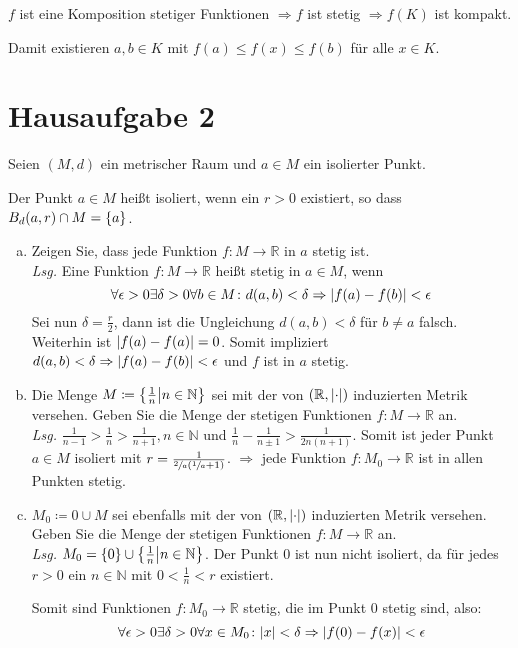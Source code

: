 \documentclass{scrreprt}
\begin{document}
$f$ ist eine Komposition stetiger Funktionen
$\Rightarrow f$ ist stetig
$\Rightarrow f(K)$ ist kompakt.

Damit existieren $a, b \in K$ mit $f(a) \leq f(x) \leq f(b)$ für alle
$x \in K$.

\newpage
\section*{Hausaufgabe 2}

Seien $(M, d)$ ein metrischer Raum und $a \in M$ ein isolierter Punkt.

\noindent
Der Punkt $a \in M$ heißt isoliert, wenn ein $r > 0$ existiert, so dass
$B_d(a, r) \cap M = \qty{a}$.

\begin{enumerate}[a)]
\item Zeigen Sie, dass jede Funktion $f \colon M \to \mathbb{R}$ in $a$
  stetig ist. \\

  \textit{Lsg.} Eine Funktion $f \colon M \to \mathbb{R}$ heißt stetig in
  $a \in M$, wenn
  \[
    \forall \epsilon > 0 \exists \delta > 0 \forall b \in M
    \colon d(a, b) < \delta \Rightarrow \abs{f(a) - f(b)} < \epsilon
  \]
  Sei nun $\delta = \frac{r}{2}$, dann ist die Ungleichung
  $d(a, b) < \delta$ für $b \ne a$ falsch.
  Weiterhin ist $\abs{f(a) - f(a)} = 0$.
  Somit impliziert $d(a, b) < \delta \Rightarrow \abs{f(a) - f(b)} < \epsilon$
  und $f$ ist in $a$ stetig.

\item Die Menge $M \coloneqq \qty{\frac{1}{n} \middle| n \in \mathbb{N}}$
  sei mit der von $(\mathbb{R}, \abs{\cdot})$ induzierten Metrik versehen.
  Geben Sie die Menge der stetigen Funktionen $f \colon M \to \mathbb{R}$
  an. \\

  \textit{Lsg.}
  $\frac{1}{n - 1} > \frac{1}{n} > \frac{1}{n + 1}, n \in \mathbb{N}$ und
  $\frac{1}{n} - \frac{1}{n \pm 1} > \frac{1}{2n(n + 1)}$.
  Somit ist jeder Punkt $a \in M$ isoliert mit
  $r = \frac{1}{\sfrac{2}{a}\qty(\sfrac{1}{a} + 1)}$.
  $\Rightarrow$ jede Funktion $f \colon M_0 \to \mathbb{R}$ ist in allen
  Punkten stetig.

\item $M_0 \coloneqq \qty{0} \cup M$ sei ebenfalls mit der von
  $(\mathbb{R}, \abs{\cdot})$ induzierten Metrik versehen.
  Geben Sie die Menge der stetigen Funktionen $f \colon M \to \mathbb{R}$
  an. \\

  \textit{Lsg.} $M_0 = \qty{0} \cup \qty{\frac{1}{n} \middle| n \in \mathbb{N}}$.
  Der Punkt $0$ ist nun nicht isoliert, da für jedes $r > 0$ ein
  $n \in \mathbb{N}$ mit $0 < \frac{1}{n} < r$ existiert.

  Somit sind Funktionen $f \colon M_0 \to \mathbb{R}$ stetig, die im Punkt $0$
  stetig sind, also:
  \[
    \forall \epsilon > 0 \exists \delta > 0 \forall x \in M_0
    \colon \abs{x} < \delta \Rightarrow \abs{f(0) - f(x)} < \epsilon
  \]

\end{enumerate}
\end{document}
